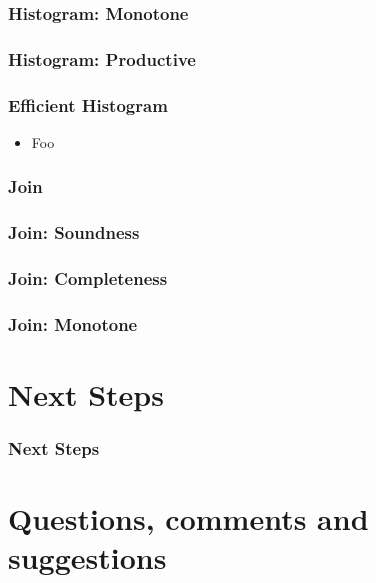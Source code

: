\documentclass[aspectratio=169,10pt]{beamer}
\begin{document}
\begin{frame}
  \frametitle{Histogram: Monotone}
\end{frame}

\begin{frame}
  \frametitle{Histogram: Productive}
\end{frame}

\begin{frame}
  \frametitle{Efficient Histogram}
  \begin{itemize}
    \item Foo
  \end{itemize}
\end{frame}

\begin{frame}
  \frametitle{Join}
\end{frame}

\begin{frame}
  \frametitle{Join: Soundness}
\end{frame}

\begin{frame}
  \frametitle{Join: Completeness}
\end{frame}

\begin{frame}
  \frametitle{Join: Monotone}
\end{frame}

\section{Next Steps}

\begin{frame}
  \frametitle{Next Steps}
\end{frame}

\section{Questions, comments and suggestions}
\end{document}
